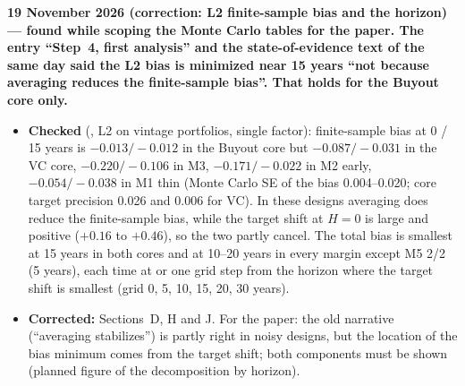 \documentclass[11pt]{article}
\newcommand{\file}[1]{\path{#1}}
\begin{document}
\textbf{19 November 2026 (correction: L2 finite-sample bias and the horizon) --- found while scoping the Monte Carlo tables for the paper. The entry ``Step~4, first analysis'' and the state-of-evidence text of the same day said the L2 bias is minimized near 15 years ``not because averaging reduces the finite-sample bias''. That holds for the Buyout core only.}
\begin{itemize}
\item \textbf{Checked} (\file{results/mc_step4/summary.csv}, L2 on vintage portfolios, single factor): finite-sample bias at 0 / 15 years is $-0.013/-0.012$ in the Buyout core but $-0.087/-0.031$ in the VC core, $-0.220/-0.106$ in M3, $-0.171/-0.022$ in M2 early, $-0.054/-0.038$ in M1 thin (Monte Carlo SE of the bias 0.004--0.020; core target precision 0.026 and 0.006 for VC). In these designs averaging does reduce the finite-sample bias, while the target shift at $H=0$ is large and positive ($+0.16$ to $+0.46$), so the two partly cancel. The total bias is smallest at 15 years in both cores and at 10--20 years in every margin except M5 2/2 (5 years), each time at or one grid step from the horizon where the target shift is smallest (grid 0, 5, 10, 15, 20, 30 years).
\item \textbf{Corrected:} Sections~D, H and J. For the paper: the old narrative (``averaging stabilizes'') is partly right in noisy designs, but the location of the bias minimum comes from the target shift; both components must be shown (planned figure of the decomposition by horizon).
\end{itemize}
\end{document}
